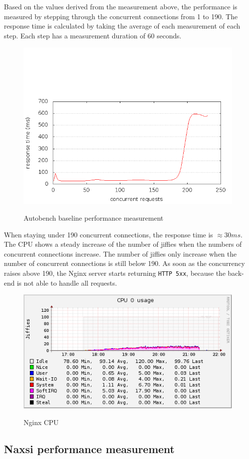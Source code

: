 \documentclass[Measurements]{subfiles}
\begin{document}
Based on the values derived from the measurement above, the performance is measured by stepping through the concurrent connections from 1 to 190. The response time is calculated by taking the average of each measurement of  each step. Each step has a measurement duration of 60 seconds. 

\begin{figure}[h]
\caption{Autobench baseline performance measurement}
\centering
\includegraphics[scale=0.4] {images/results/baseline/output2.png}
\label{fig:Baseline performance measurement}
\end{figure}

When staying under 190 concurrent connections, the response time is $\approx 30 ms$. The CPU shows a steady increase of the number of jiffies when the numbers of concurrent connections increase. The number of jiffies only increase when the number of concurrent connections is still below 190. As soon as the concurrency raises above 190, the Nginx server starts returning \verb+HTTP 5xx+, because the back-end is not able to handle all requests.

\begin{figure}[h]
\caption{Nginx CPU}
\centering
\includegraphics[scale=0.4] {images/results/baseline/cpu.png}
\label{fig:Baseline performance measurement}
\end{figure}

\subsection{Naxsi performance measurement}
\end{document}
